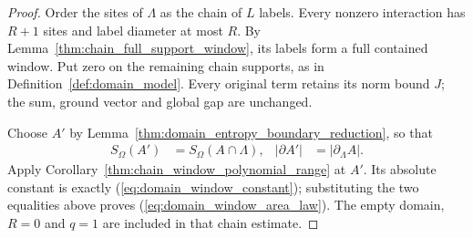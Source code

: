 \begin{proof}
    \leanok
    Order the sites of $\Lambda$ as the chain of $L$ labels. Every
    nonzero interaction has $R+1$ sites and label diameter at most $R$.
    By Lemma~\ref{thm:chain_full_support_window}, its labels form a
    full contained window. Put zero on the remaining chain supports,
    as in Definition~\ref{def:domain_model}. Every original term retains
    its norm bound $J$; the sum, ground vector and global gap are unchanged.

    Choose $A'$ by Lemma~\ref{thm:domain_entropy_boundary_reduction},
    so that
    \begin{align}
        S_\Omega(A')  & =S_\Omega(A\cap\Lambda), &
        |\partial A'| & =|\partial_\Lambda A|.
        \label{eq:domain_window_reduction}
    \end{align}
    Apply Corollary~\ref{thm:chain_window_polynomial_range} at $A'$.
    Its absolute constant is exactly
    (\ref{eq:domain_window_constant}); substituting the two equalities
    above proves (\ref{eq:domain_window_area_law}). The empty domain,
    $R=0$ and $q=1$ are included in that chain estimate.
\end{proof}

